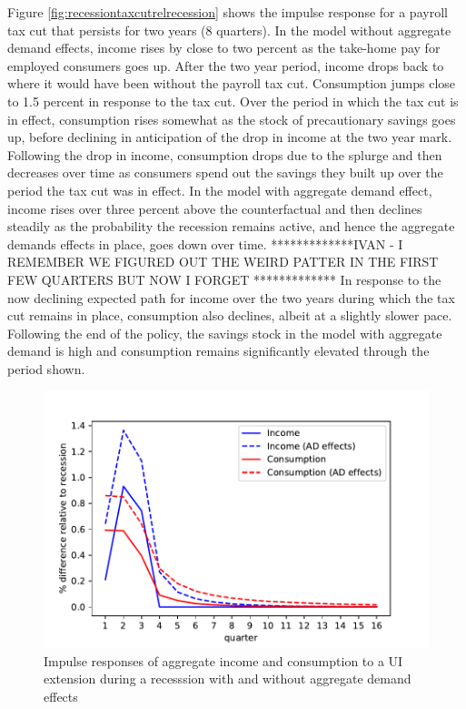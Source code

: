 \documentclass[../HAFiscal]{subfiles}
\begin{document}
Figure \ref{fig:recessiontaxcutrelrecession} shows the impulse response for a payroll tax cut that persists for two years (8 quarters). In the model without aggregate demand effects, income rises by close to two percent as the take-home pay for employed consumers goes up. After the two year period, income drops back to where it would have been without the payroll tax cut. Consumption jumps close to 1.5 percent in response to the tax cut. Over the period in which the tax cut is in effect, consumption rises somewhat as the stock of precautionary savings goes up, before declining in anticipation of the drop in income at the two year mark. Following the drop in income, consumption drops due to the splurge and then decreases over time as consumers spend out the savings they built up over the period the tax cut was in effect. In the model with aggregate demand effect, income rises over three percent above the counterfactual and then declines steadily as the probability the recession remains active, and hence the aggregate demands effects in place, goes down over time. *************IVAN - I REMEMBER WE FIGURED OUT THE WEIRD PATTER IN THE FIRST FEW QUARTERS BUT NOW I FORGET ************* In response to the now declining expected path for income over the two years during which the tax cut remains in place, consumption also declines, albeit at a slightly slower pace. Following the end of the policy, the savings stock in the model with aggregate demand is high and consumption remains significantly elevated through the period shown.

\begin{figure}
	\centering
	\includegraphics[width=0.8\linewidth]{Code/HA-Models/FromPandemicCode/Figures/recession_UI_relrecession}
	\caption{Impulse responses of aggregate income and consumption to a UI extension during a recesssion with and without aggregate demand effects}
	\label{fig:recessionuirelrecession}
\end{figure}
\end{document}
